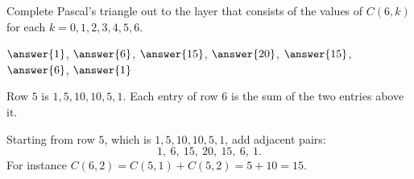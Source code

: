 \documentclass[12pt]{ximera}
\begin{document}
\begin{problem}
Complete Pascal's triangle out to the layer that consists of the values of $C(6,k)$
for each $k=0,1,2,3,4,5,6$.

$\answer{1}$, $\answer{6}$, $\answer{15}$, $\answer{20}$, $\answer{15}$,
$\answer{6}$, $\answer{1}$

\begin{hint}
Row $5$ is $1, 5, 10, 10, 5, 1$. Each entry of row $6$ is the sum of the two entries
above it.
\end{hint}

\begin{feedback}
Starting from row $5$, which is $1, 5, 10, 10, 5, 1$, add adjacent pairs:
\[ 1,\ 6,\ 15,\ 20,\ 15,\ 6,\ 1. \]
For instance $C(6,2)=C(5,1)+C(5,2)=5+10=15$.
\end{feedback}
\end{problem}
\end{document}

